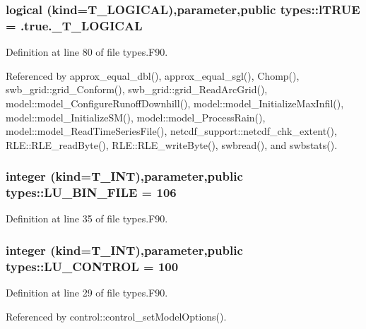 \hypertarget{namespacetypes_a440f71bd0dd529ae3aaa8309171baa67}{
\subsubsection[{lTRUE}]{\setlength{\rightskip}{0pt plus 5cm}logical (kind={\bf T\_\-LOGICAL}),parameter,public {\bf types::lTRUE} = .true.\_\-T\_\-LOGICAL}}
\label{namespacetypes_a440f71bd0dd529ae3aaa8309171baa67}


Definition at line 80 of file types.F90.



Referenced by approx\_\-equal\_\-dbl(), approx\_\-equal\_\-sgl(), Chomp(), swb\_\-grid::grid\_\-Conform(), swb\_\-grid::grid\_\-ReadArcGrid(), model::model\_\-ConfigureRunoffDownhill(), model::model\_\-InitializeMaxInfil(), model::model\_\-InitializeSM(), model::model\_\-ProcessRain(), model::model\_\-ReadTimeSeriesFile(), netcdf\_\-support::netcdf\_\-chk\_\-extent(), RLE::RLE\_\-readByte(), RLE::RLE\_\-writeByte(), swbread(), and swbstats().

\hypertarget{namespacetypes_aa6744b73e58d8433783e0f423c3a1a72}{
\subsubsection[{LU\_\-BIN\_\-FILE}]{\setlength{\rightskip}{0pt plus 5cm}integer (kind={\bf T\_\-INT}),parameter,public {\bf types::LU\_\-BIN\_\-FILE} = 106}}
\label{namespacetypes_aa6744b73e58d8433783e0f423c3a1a72}


Definition at line 35 of file types.F90.

\hypertarget{namespacetypes_acebd133f6b8d69d9ba284172dfba9388}{
\subsubsection[{LU\_\-CONTROL}]{\setlength{\rightskip}{0pt plus 5cm}integer (kind={\bf T\_\-INT}),parameter,public {\bf types::LU\_\-CONTROL} = 100}}
\label{namespacetypes_acebd133f6b8d69d9ba284172dfba9388}


Definition at line 29 of file types.F90.



Referenced by control::control\_\-setModelOptions().

